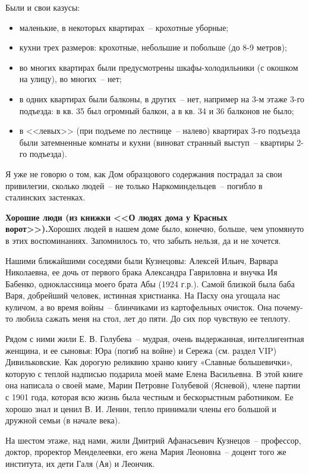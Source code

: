 Были и свои казусы:
\begin{itemize}
\item маленькие, в некоторых квартирах~-- крохотные уборные;
\item кухни трех размеров: крохотные, небольшие и побольше (до 8-9 метров);
\item во многих квартирах были предусмотрены шкафы-холодильники (с окошком на улицу), во многих~-- нет;
\item в одних квартирах были балконы, в других~-- нет, например на 3-м этаже 3-го подъезда: в кв. 35 был огромный балкон, а в кв. 34 и 36 балконов не было;
\item в <<левых>> (при подъеме по лестнице~-- налево) квартирах 3-го подъезда были затемненные комнаты и кухни (виноват странный выступ~-- квартиры 2-го подъезда). 
\end{itemize}

Я уже не говорю о том, как Дом образцового содержания пострадал за свои привилегии, сколько людей~-- не только Наркоминдельцев~-- погибло в сталинских застенках.

\textbf{Хорошие люди (из книжки <<О людях дома у Красных ворот>>).}Хороших людей в нашем доме было, конечно, больше, чем упомянуто в этих воспоминаниях. Запомнилось то, что забыть нельзя, да и не хочется.

Нашими ближайшими соседями были Кузнецовы: Алексей Ильич, Варвара Николаевна, ее дочь от первого брака Александра Гавриловна и внучка Ия Бабенко, одноклассница моего брата Абы (1924 г.р.). Самой близкой была баба Варя, добрейший человек, истинная христианка. На Пасху она угощала нас куличом, а во время войны~-- блинчиками из картофельных очисток. Она почему-то любила сажать меня на стол, лет до пяти. До сих пор чувствую ее теплоту.

Рядом с ними жили Е. В. Голубева~-- мудрая, очень выдержанная, интеллигентная женщина, и ее сыновья: Юра (погиб на войне) и Сережа (см. раздел VIP) Дивильковские. Как дорогую реликвию храню книгу «Славные большевички», которую с теплой надписью подарила моей маме Елена Васильевна. В этой книге она написала о своей маме, Марии Петровне Голубевой (Ясневой), члене партии с 1901 года, которая всю жизнь была честным и бескорыстным работником. Ее хорошо знал и ценил В. И. Ленин, тепло принимали члены его большой и дружной семьи (в начале века).

На шестом этаже, над нами, жили Дмитрий Афанасьевич Кузнецов~-- профессор, доктор, проректор Менделеевки, его жена Мария Леоновна~-- доцент того же института, их дети Галя (Ая) и Леончик.



